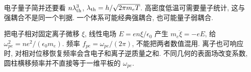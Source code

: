 电子量子简并还要看 $n\lambda_{\rm th}^3$, $\lambda_{\rm th}=h/\sqrt{2\pi m_eT}$. 高密度低温可需要量子统计, 这与强耦合不是同一个判据. 一个体系可能经典强耦合, 也可能量子弱耦合.

把电子相对固定离子微移 $\xi$, 线性电场 $E=en\xi/\epsilon_0$ 产生 $m_e\ddot\xi=-eE$, 给 $\omega_{pe}^2=ne^2/(\epsilon_0m_e)$. 频率 $f_{pe}=\omega_{pe}/(2\pi)$, 不能把两者数值混用. 离子也可响应时, 对相对位移恢复频率会含电子和离子逆质量之和. 不同几何的表面场改变系数, 圆柱横移频率并不直接等于一维平板的 $\omega_{pe}$.
